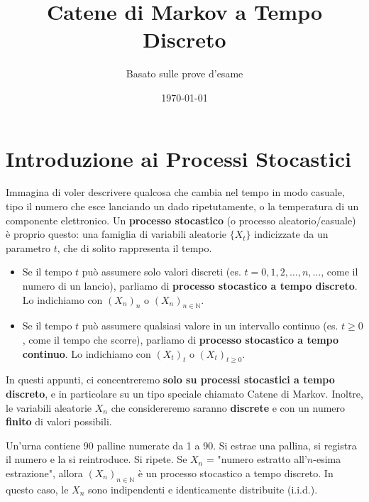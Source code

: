 

\title{Catene di Markov a Tempo Discreto}
\author{Basato sulle prove d'esame}
\date{\today}


\maketitle
\tableofcontents

\usetikzlibrary{arrows}

\newpage

\section{Introduzione ai Processi Stocastici}
Immagina di voler descrivere qualcosa che cambia nel tempo in modo casuale, tipo il numero che esce lanciando un dado ripetutamente, o la temperatura di un componente elettronico.
Un \textbf{processo stocastico} (o processo aleatorio/casuale) è proprio questo: una famiglia di variabili aleatorie $\{X_t\}$ indicizzate da un parametro $t$, che di solito rappresenta il tempo.

\begin{itemize}
    \item Se il tempo $t$ può assumere solo valori discreti (es. $t=0, 1, 2, \dots, n, \dots$, come il numero di un lancio), parliamo di \textbf{processo stocastico a tempo discreto}. Lo indichiamo con $(X_n)_n$ o $(X_n)_{n \in \mathbb{N}}$.
    \item Se il tempo $t$ può assumere qualsiasi valore in un intervallo continuo (es. $t \ge 0$, come il tempo che scorre), parliamo di \textbf{processo stocastico a tempo continuo}. Lo indichiamo con $(X_t)_t$ o $(X_t)_{t \ge 0}$.
\end{itemize}
In questi appunti, ci concentreremo \textbf{solo su processi stocastici a tempo discreto}, e in particolare su un tipo speciale chiamato Catene di Markov. Inoltre, le variabili aleatorie $X_n$ che considereremo saranno \textbf{discrete} e con un numero \textbf{finito} di valori possibili.

\begin{example}
Un'urna contiene 90 palline numerate da 1 a 90. Si estrae una pallina, si registra il numero e la si reintroduce. Si ripete.
Se $X_n$ = "numero estratto all'$n$-esima estrazione", allora $(X_n)_{n \in \mathbb{N}}$ è un processo stocastico a tempo discreto. In questo caso, le $X_n$ sono indipendenti e identicamente distribuite (i.i.d.).
\end{example}

